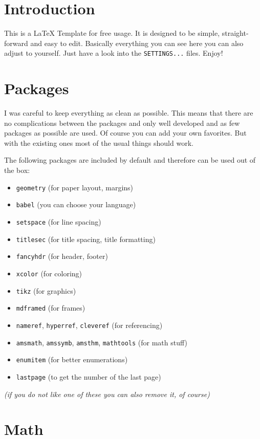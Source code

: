 \documentclass[11pt, a4paper]{article}
\begin{document}
\section{Introduction}

This is a \LaTeX{} Template for free usage. It is designed to be simple, straight-forward and easy to edit.
Basically everything you can see here you can also adjust to yourself. Just have a look into the \texttt{SETTINGS...} files. Enjoy!

\section{Packages}

I was careful to keep everything as clean as possible. This means that there are no complications between the packages and only well developed and as few packages as possible are used. Of course you can add your own favorites. But with the existing ones most of the usual things should work.

The following packages are included by default and therefore can be used out of the box:

\begin{itemize}[noitemsep]
\item \texttt{geometry} (for paper layout, margins)
\item \texttt{babel} (you can choose your language)
\item \texttt{setspace} (for line spacing)
\item \texttt{titlesec} (for title spacing, title formatting)
\item \texttt{fancyhdr} (for header, footer)
\item \texttt{xcolor} (for coloring)
\item \texttt{tikz} (for graphics)
\item \texttt{mdframed} (for frames)
\item \texttt{nameref}, \texttt{hyperref}, \texttt{cleveref} (for referencing)
\item \texttt{amsmath}, \texttt{amssymb}, \texttt{amsthm}, \texttt{mathtools} (for math stuff)
\item \texttt{enumitem} (for better enumerations)
\item \texttt{lastpage} (to get the number of the last page)
\end{itemize}

\textsl{(if you do not like one of these you can also remove it, of course)}

\section{Math}
\end{document}
